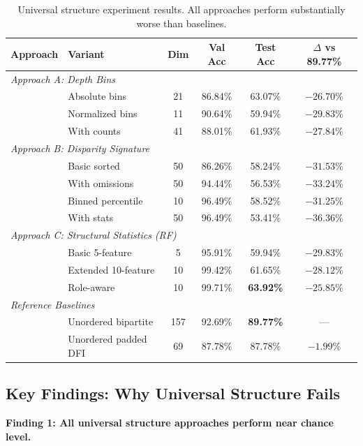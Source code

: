 \documentclass[12pt,a4paper]{article}
\begin{document}
\begin{table}[h]
\centering
\small
\begin{tabular}{llcccc}
\hline
\textbf{Approach} & \textbf{Variant} & \textbf{Dim} & \textbf{Val Acc} & \textbf{Test Acc} & \textbf{$\Delta$ vs 89.77\%} \\
\hline
\multicolumn{6}{l}{\textit{Approach A: Depth Bins}} \\
\quad & Absolute bins & 21 & 86.84\% & 63.07\% & $-26.70\%$ \\
\quad & Normalized bins & 11 & 90.64\% & 59.94\% & $-29.83\%$ \\
\quad & With counts & 41 & 88.01\% & 61.93\% & $-27.84\%$ \\
\midrule
\multicolumn{6}{l}{\textit{Approach B: Disparity Signature}} \\
\quad & Basic sorted & 50 & 86.26\% & 58.24\% & $-31.53\%$ \\
\quad & With omissions & 50 & 94.44\% & 56.53\% & $-33.24\%$ \\
\quad & Binned percentile & 10 & 96.49\% & 58.52\% & $-31.25\%$ \\
\quad & With stats & 50 & 96.49\% & 53.41\% & $-36.36\%$ \\
\midrule
\multicolumn{6}{l}{\textit{Approach C: Structural Statistics (RF)}} \\
\quad & Basic 5-feature & 5 & 95.91\% & 59.94\% & $-29.83\%$ \\
\quad & Extended 10-feature & 10 & 99.42\% & 61.65\% & $-28.12\%$ \\
\quad & Role-aware & 10 & 99.71\% & \textbf{63.92\%} & $-25.85\%$ \\
\midrule
\multicolumn{6}{l}{\textit{Reference Baselines}} \\
\quad & Unordered bipartite & 157 & 92.69\% & \textbf{89.77\%} & --- \\
\quad & Unordered padded DFI & 69 & 87.78\% & 87.78\% & $-1.99\%$ \\
\hline
\end{tabular}
\caption{Universal structure experiment results. All approaches perform substantially worse than baselines.}
\label{tab:universal_structure_results}
\end{table}

\subsection{Key Findings: Why Universal Structure Fails}

\textbf{Finding 1: All universal structure approaches perform near chance level.}
\end{document}
